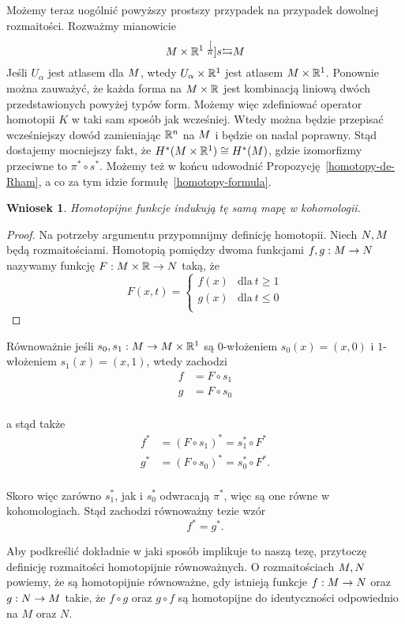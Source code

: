 \documentclass[licencjacka]{pracamgr}
\theoremstyle{definition}
\theoremstyle{definition}
\theoremstyle{plain}
\theoremstyle{plain}
\theoremstyle{plain}
\theoremstyle{plain}
\newtheorem{wniosek}{Wniosek}[section]
\def\M{\ensuremath M}
\def\N{\ensuremath N}
\def\R{\ensuremath\mathbb{R}}
\begin{document}
Możemy teraz uogólnić powyższy prostszy przypadek na przypadek dowolnej
rozmaitości. Rozważmy mianowicie
\[
 \M \times \R^1 \stackrel[\pi]{s}{\leftrightarrows} \M
\]
Jeśli ${U_\alpha}$ jest atlasem dla $\M$, wtedy ${U_\alpha \times \R^1}$ jest
atlasem $\M \times \R^1$. Ponownie można zauważyć, że każda forma na $\M \times
\R$ jest kombinacją liniową dwóch przedstawionych powyżej typów form.  Możemy
więc zdefiniować operator homotopii $K$ w taki sam sposób jak wcześniej.  Wtedy
można będzie przepisać wcześniejszy dowód zamieniając $\R^n$ na $\M$ i będzie
on nadal poprawny. Stąd dostajemy mocniejszy fakt, że $ H^\ast( \M \times
\R^1) \cong H^\ast( \M) $, gdzie izomorfizmy przeciwne to $\pi^\ast \circ
s^\ast$. Możemy też w końcu udowodnić Propozycję~\ref{homotopy-de-Rham}, a co
za tym idzie formułę~\ref{homotopy-formula}.

\begin{wniosek}
Homotopijne funkcje indukują tę samą mapę w kohomologii.
\end{wniosek}
\begin{proof}
Na potrzeby argumentu przypomnijmy definicję homotopii.  Niech $\N, \M$ będą
rozmaitościami.  Homotopią pomiędzy dwoma funkcjami $f,g: \M \rightarrow \N$
nazywamy funkcję $F: \M \times \R \rightarrow \N$ taką, że
\[
F(x,t) = 
\begin{cases}
f(x) & \text{dla}~t \geq 1 \\
g(x) & \text{dla}~t \leq 0 \\
\end{cases}
\]
\end{proof}
Równoważnie jeśli $s_0,s_1: \M \rightarrow  \M \times \R^1$ są $0$-włożeniem
$s_0(x) = (x, 0)$ i $1$-włożeniem $s_1(x) = (x,1)$, wtedy zachodzi
\begin{align*}
f &= F \circ s_1 \\
g &= F \circ s_0 \\
\end{align*}

a stąd także
\begin{align*}
f^\ast &= (F \circ s_1)^\ast = s_1^\ast \circ F^\ast \\
g^\ast &= (F \circ s_0)^\ast = s_0^\ast \circ F^\ast. \\
\end{align*}

Skoro więc zarówno $s_1^\ast$, jak i $s_0^\ast$ odwracają $\pi^\ast$, więc
są one równe w kohomologiach. Stąd zachodzi równoważny tezie wzór
\[
f^\ast = g^\ast.
\] 

Aby podkreślić dokładnie w jaki sposób implikuje to naszą tezę, przytoczę
definicję rozmaitości homotopijnie równoważnych. O rozmaitościach $\M, \N$
powiemy, że są homotopijnie równoważne, gdy istnieją funkcje
$f: \M \rightarrow \N$ oraz $g: \N \rightarrow \M$ takie, że
$f \circ g$ oraz $g \circ f$ są homotopijne do identyczności odpowiednio
na $M$ oraz $N$. \\
\end{document}
